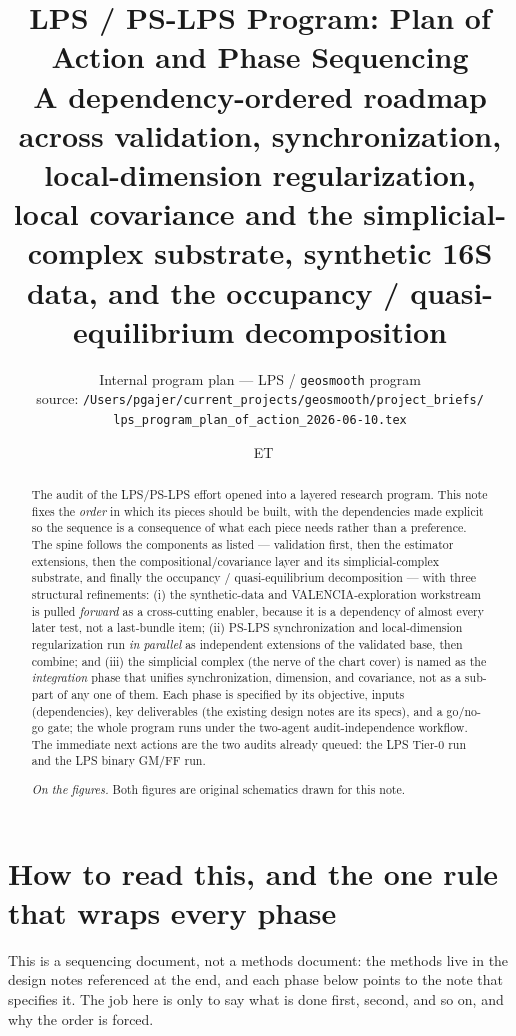 \documentclass[11pt]{article}
\title{\textbf{LPS / PS-LPS Program: Plan of Action and Phase Sequencing}\\[4pt]
\large A dependency-ordered roadmap across validation, synchronization,
local-dimension regularization, local covariance and the simplicial-complex
substrate, synthetic 16S data, and the occupancy / quasi-equilibrium decomposition}
\author{\small Internal program plan --- LPS / \texttt{geosmooth} program\\[2pt]
\footnotesize source: \nolinkurl{/Users/pgajer/current_projects/geosmooth/project_briefs/}\\[1pt]
\footnotesize\nolinkurl{lps_program_plan_of_action_2026-06-10.tex}}
\date{\DTMnow\ \textnormal{\footnotesize ET}}
\begin{document}
\maketitle

\begin{abstract}\noindent
The audit of the LPS/PS-LPS effort opened into a layered research program. This
note fixes the \emph{order} in which its pieces should be built, with the
dependencies made explicit so the sequence is a consequence of what each piece
needs rather than a preference. The spine follows the components as listed ---
validation first, then the estimator extensions, then the compositional/covariance
layer and its simplicial-complex substrate, and finally the occupancy /
quasi-equilibrium decomposition --- with three structural refinements: (i) the
synthetic-data and VALENCIA-exploration workstream is pulled \emph{forward} as a
cross-cutting enabler, because it is a dependency of almost every later test, not a
last-bundle item; (ii) PS-LPS synchronization and local-dimension regularization run
\emph{in parallel} as independent extensions of the validated base, then combine;
and (iii) the simplicial complex (the nerve of the chart cover) is named as the
\emph{integration} phase that unifies synchronization, dimension, and covariance,
not as a sub-part of any one of them. Each phase is specified by its objective,
inputs (dependencies), key deliverables (the existing design notes are its specs),
and a go/no-go gate; the whole program runs under the two-agent audit-independence
workflow. The immediate next actions are the two audits already queued: the LPS
Tier-0 run and the LPS binary GM/FF run.
\par\medskip\noindent\footnotesize\textit{On the figures.} Both figures are
original schematics drawn for this note.
\end{abstract}

{\small\tableofcontents}

\section{How to read this, and the one rule that wraps every phase}\label{sec:read}

This is a sequencing document, not a methods document: the methods live in the
design notes referenced at the end, and each phase below points to the note that
specifies it. The job here is only to say what is done first, second, and so on,
and why the order is forced.
\end{document}
